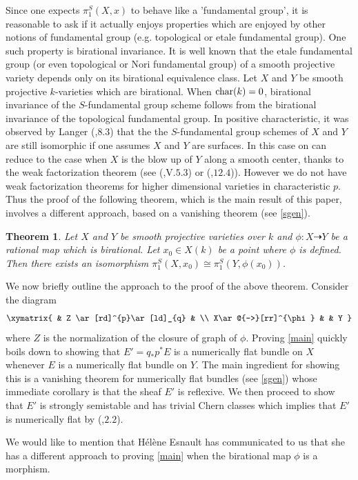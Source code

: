 \documentclass[12pt,oneside]{amsart}
\theoremstyle{plain}
\newtheorem{thm}{Theorem}[section]
\theoremstyle{definition}
\newcommand{\Char}{{\rm char}}
\begin{document}
Since one expects $\pi_1^S(X,x)$ to behave like a 'fundamental group', it is reasonable to ask if it actually enjoys properties which are enjoyed by other notions of fundamental group (e.g. topological or etale fundamental group). One such property is birational invariance. It is well known that the etale fundamental group (or even topological or Nori fundamental group) of a smooth projective variety depends only on its birational equivalence class. 
Let $X$ and $Y$ be smooth projective $k$-varieties which are birational. When $\Char(k)=0$, birational invariance of the $S$-fundamental group scheme follows from the birational invariance of the topological fundamental group. In positive characteristic, it was observed by Langer (\cite{langer1},$8.3$) that the the $S$-fundamental group schemes of $X$ and $Y$ are still isomorphic if one assumes $X$ and $Y$ are surfaces. In this case on can reduce to the case when $X$ is the blow up of $Y$ along a smooth center, thanks to the weak factorization theorem (see (\cite{hartshorne},V.$5.3$) or (\cite{wlodarczyk},$12.4$)). However we do not have weak factorization theorems for higher dimensional varieties in characteristic $p$. Thus the proof of the following theorem, which is the main result of this paper, involves a different approach, based on a vanishing theorem (see \eqref{sgen}).
\begin{thm} \label{main} Let $X$ and $Y$ be smooth projective varieties over $k$ and $\phi:X\dashrightarrow Y$ be a rational map which is birational. Let $x_0\in X(k)$ be a point where $\phi$ is defined. Then there exists an isomorphism $ \pi_1^S(X,x_0) \cong \pi_1^S(Y,\phi(x_0))$.
\end{thm}


We now briefly outline the approach to the proof of the above theorem. Consider the diagram 
$$\xymatrix{
	&	Z \ar[rd]^{p}\ar[ld]_{q} & \\
	X\ar@{-->}[rr]^{\phi} & & Y
}$$
where $Z$ is the normalization of the closure of graph of $\phi$. Proving \eqref{main} quickly boils down to showing that $E'=q_*p^*E$ is a numerically flat bundle on $X$ whenever $E$ is a numerically flat bundle on $Y$. The main ingredient for showing this is a vanishing theorem for numerically flat bundles (see \eqref{sgen}) whose immediate corollary is that the sheaf $E'$ is reflexive. We then proceed to show that $E'$ is strongly semistable and has trivial Chern classes which implies that $E'$ is numerically flat by (\cite{langer2},$2.2$).

We would like to mention that H\'el\`ene Esnault has communicated to us that she has a different approach to proving \eqref{main} when the birational map $\phi$ is a morphism. \\
\end{document}
